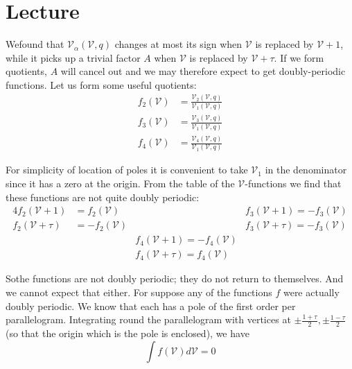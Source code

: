 \chapter{Lecture}\label{part2:lec11} %

We\pageoriginale found that $\mathscr{V}_\alpha (\mathscr{V}, q)$ changes at most
its sign when $\mathscr{V}$ is replaced by $\mathscr{V}+1$, while it
picks up a trivial factor $A$ when $\mathscr{V}$ is replaced by
$\mathscr{V}+ \tau$. If we form quotients, $A$ will cancel out and we
may therefore expect to get doubly-periodic functions. Let us form
some useful quotients:
\begin{align*}
  f_2 (\mathscr{V}) & = \frac{\mathscr{V}_2(\mathscr{V},
    q)}{\mathscr{V}_1 (\mathscr{V}, q)}\\
  f_3 (\mathscr{V}) & = \frac{\mathscr{V}_3 (\mathscr{V},
    q)}{\mathscr{V}_1 (\mathscr{V}, q)}\\
  f_4 (\mathscr{V}) & = \frac{\mathscr{V}_4(\mathscr{V},
    q)}{\mathscr{V}_1 (\mathscr{V}, q)}
\end{align*}

For simplicity of location of poles it is convenient to take
$\mathscr{V}_1$ in the denominator since it has a zero at the
origin. From the table of the $\mathscr{V}$-functions we find that
these functions are not quite doubly periodic:
\begin{alignat*}{4}
  f_2 (\mathscr{V}+1) & = f_2 (\mathscr{V}) & \qquad & f_3 (\mathscr{V}+1) 
  = - f_3 (\mathscr{V})\\
  f_2 (\mathscr{V}+\tau) & = -f_2 (\mathscr{V}) && f_3 (\mathscr{V}+\tau)
   = -f_3 (\mathscr{V})\\
   && f_4 (\mathscr{V}+1)  = -f_4 (\mathscr{V})\\
   && f_4 (\mathscr{V}+\tau)  = f_4 (\mathscr{V})~~\,
\end{alignat*}

So\pageoriginale the functions are not doubly periodic; they do not
return to themselves. And we cannot expect that either. For suppose
any of the functions $f$ were actually doubly periodic. We know that
each has a pole of the first order per parallelogram. Integrating
round the parallelogram with vertices at $\pm \frac{1+ \tau}{2}, \pm
\frac{1-\tau}{2}$ (so that the origin which is the pole is enclosed),
we have
$$
\int f(\mathscr{V}) d \mathscr{V} =0 
$$

